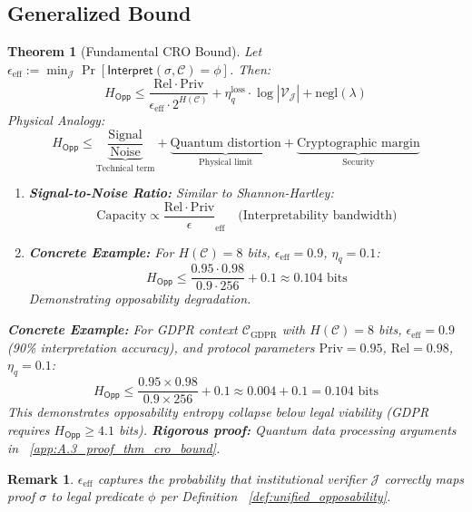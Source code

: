 \documentclass[preprint,12pt]{elsarticle}
\newtheorem{theorem}{Theorem}[section]
\newtheorem{remark}{Remark}[section]
\newcommand{\negl}{\mathrm{negl}}
\begin{document}
        \subsection{Generalized Bound}
            \begin{theorem}[Fundamental CRO Bound]\label{thm:cro_bound}
                Let $\epsilon_{\text{eff}} := \min_{\mathcal{J}} \Pr[\mathsf{Interpret}(\sigma, \mathcal{C}) = \phi]$. Then:
                \begin{equation}\label{eq:cro_bound}
                    H_{\mathsf{Opp}} \leq \frac{\mathrm{Rel} \cdot \mathrm{Priv}}{\epsilon_{\text{eff}} \cdot 2^{H(\mathcal{C})}} + \eta_q^{\text{loss}} \cdot \log|\mathcal{V_J}| + \negl(\lambda)
                \end{equation}
                \textit{Physical Analogy:}
                \[
                    H_{\mathsf{Opp}} \leq \underbrace{\frac{\text{Signal}}{\text{Noise}}}_{\text{Technical term}} + \underbrace{\text{Quantum distortion}}_{\text{Physical limit}} + \underbrace{\text{Cryptographic margin}}_{\text{Security}}
                \]
                \begin{enumerate}
                    \item \textbf{Signal-to-Noise Ratio:} Similar to Shannon-Hartley:
                    \[
                    \text{Capacity} \propto \frac{\mathrm{Rel} \cdot \mathrm{Priv}}\epsilon_{\text{eff}} \quad \text{(Interpretability bandwidth)}
                    \]
                    
                    \item \textbf{Concrete Example:} For $H(\mathcal{C}) = 8$ bits, $\epsilon_{\text{eff}} = 0.9$, $\eta_q = 0.1$:
                    \[
                    H_{\mathsf{Opp}} \leq \frac{0.95 \cdot 0.98}{0.9 \cdot 256} + 0.1 \approx 0.104 \text{ bits}
                    \]
                    Demonstrating opposability degradation.
                \end{enumerate}
                \textbf{Concrete Example:} For GDPR context $\mathcal{C}_{\text{GDPR}}$ with $H(\mathcal{C}) = 8$ bits, $\epsilon_{\text{eff}} = 0.9$ (90\% interpretation accuracy), and protocol parameters $\mathrm{Priv} = 0.95$, $\mathrm{Rel} = 0.98$, $\eta_q = 0.1$:
                    \[
                    H_{\mathsf{Opp}} \leq \frac{0.95 \times 0.98}{0.9 \times 256} + 0.1 \approx 0.004 + 0.1 = 0.104 \text{ bits}
                    \]
                    This demonstrates opposability entropy collapse below legal viability (GDPR requires $H_{\mathsf{Opp}} \geq 4.1$ bits).
                \textbf{Rigorous proof:} Quantum data processing arguments in ~\ref{app:A.3_proof_thm_cro_bound}.
            \end{theorem}
            \begin{remark}
                $\epsilon_{\text{eff}}$ captures the probability that institutional verifier $\mathcal{J}$ correctly maps proof $\sigma$ to legal predicate $\phi$ per Definition ~\ref{def:unified_opposability}.
            \end{remark}
\end{document}
